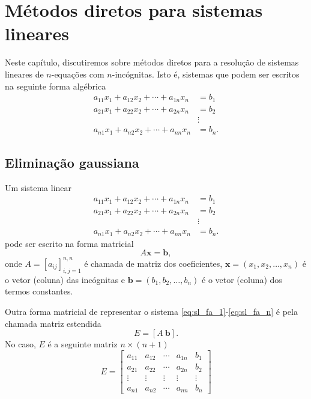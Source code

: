 
\chapter{Métodos diretos para sistemas lineares}\label{cap_sl_direto}
\thispagestyle{fancy}

Neste capítulo, discutiremos sobre métodos diretos para a resolução de sistemas lineares de $n$-equações com $n$-incógnitas. Isto é, sistemas que podem ser escritos na seguinte forma algébrica
\begin{align}
  a_{11}x_1 + a_{12}x_2 + \cdots + a_{1n}x_n &= b_1\\
  a_{21}x_1 + a_{22}x_2 + \cdots + a_{2n}x_n &= b_2\\
  &\vdots \\
  a_{n1}x_1 + a_{n2}x_2 + \cdots + a_{nn}x_n &= b_n.
\end{align}

\section{Eliminação gaussiana}\label{cap_sl_direto_sec_egauss}

Um sistema linear
\begin{align}
  a_{11}x_1 + a_{12}x_2 + \cdots + a_{1n}x_n &= b_1 \label{eq:sl_fa_1}\\
  a_{21}x_1 + a_{22}x_2 + \cdots + a_{2n}x_n &= b_2\\
  &\vdots \\
  a_{n1}x_1 + a_{n2}x_2 + \cdots + a_{nn}x_n &= b_n.\label{eq:sl_fa_n}
\end{align}
pode ser escrito na forma matricial
\begin{equation}
  A\pmb{x} = \pmb{b},
\end{equation}
onde $A = [a_{ij}]_{i,j=1}^{n,n}$ é chamada de matriz dos coeficientes, $\pmb{x}=(x_1, x_2, \dotsc, x_n)$ é o vetor (coluna) das incógnitas e $\pmb{b}=(b_1, b_2, \dotsc, b_n)$ é o vetor (coluna) dos termos constantes.

Outra forma matricial de representar o sistema \eqref{eq:sl_fa_1}-\eqref{eq:sl_fa_n} é pela chamada matriz estendida
\begin{equation}
  E = [A ~\pmb{b}].
\end{equation}
No caso, $E$ é a seguinte matriz $n \times (n+1)$
\begin{equation}
  E =
  \begin{bmatrix}
    a_{11} & a_{12} & \cdots & a_{1n} & b_1\\
    a_{21} & a_{22} & \cdots & a_{2n} & b_2\\
    \vdots & \vdots & \vdots & \vdots & \vdots\\
    a_{n1} & a_{n2} & \cdots & a_{nn} & b_n
  \end{bmatrix}
\end{equation}

